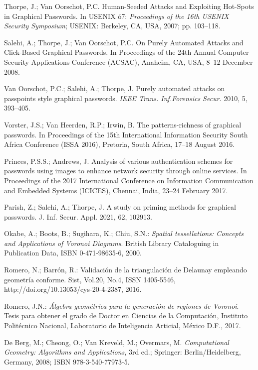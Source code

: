 \documentclass[12pt]{report}
\begin{document}
\begin{thebibliography}{9}
{		Thorpe, J.; Van Oorschot, P.C. Human-Seeded Attacks and Exploiting Hot-Spots in Graphical Passwords. In USENIX ó7: \textit{Proceedings of the 16th USENIX Security Symposium}; USENIX: Berkeley, CA, USA, 2007; pp. 103–118.
		
		Salehi, A.; Thorpe, J.; Van Oorschot, P.C. On Purely Automated Attacks and Click-Based Graphical Passwords. In Proceedings of the 24th Annual Computer Security Applications Conference (ACSAC), Anaheim, CA, USA, 8–12 December 2008.
		
		Van Oorschot, P.C.; Salehi, A.; Thorpe, J. Purely automated attacks on passpoints style graphical passwords.\textit{ IEEE Trans. Inf.Forensics Secur}. 2010, 5, 393–405.
		
		Vorster, J.S.; Van Heerden, R.P.; Irwin, B. The patterns-richness of graphical passwords. In Proceedings of the 15th International Information Security South Africa Conference (ISSA 2016), Pretoria, South Africa, 17–18 August 2016.
		
		Princes, P.S.S.; Andrews, J. Analysis of various authentication schemes for passwords using images to enhance network security through online services. In Proceedings of the 2017 International Conference on Information Communication and Embedded Systems (ICICES), Chennai, India, 23–24 February 2017.
		
		Parish, Z.; Salehi, A.; Thorpe, J. A study on priming methods for graphical passwords. J. Inf. Secur. Appl. 2021, 62, 102913.
		
		Okabe, A.; Boots, B.; Sugihara, K.; Chiu, S.N.: \textit{Spatial tessellations: Concepts and Applications of Voronoi Diagrams}. British Library Cataloguing in Publication Data, ISBN 0-471-98635-6, 2000.
		
		Romero, N.; Barrón, R.: Validación de la triangulación de Delaunay empleando geometría conforme. Sist, Vol.20, No.4, ISSN 1405-5546, http://doi.org/10.13053/cys-20-4-2387, 2016.
		
		Romero, J.N.:  \textit{Álgebra geométrica para la generación de regiones de Voronoi}. Tesis para obtener el grado de Doctor en Ciencias de la Computación, Instituto Politécnico Nacional, Laboratorio de Inteligencia Articial, México D.F., 2017.
		
		De Berg, M.; Cheong, O.; Van Kreveld, M.; Overmars, M. \textit{Computational Geometry: Algorithms and Applications}, 3rd ed.; Springer: Berlin/Heidelberg, Germany, 2008; ISBN 978-3-540-77973-5.
	
}
\end{thebibliography}
\end{document}
